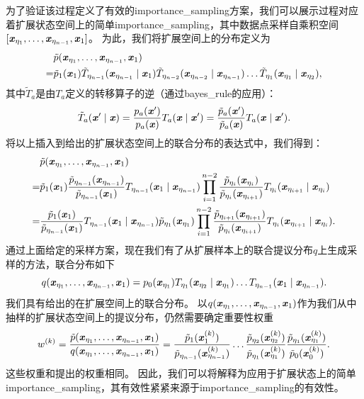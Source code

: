 为了验证该过程定义了有效的\gls{importance_sampling}方案，我们可以展示\citep{Neal-2001}过程对应着扩展状态空间上的简单\gls{importance_sampling}，其中数据点采样自乘积空间$[\Vx_{\eta_1},\dots,\Vx_{\eta_{n-1}},\Vx_1]$。
为此，我们将扩展空间上的分布定义为
\begin{align}
&\tilde{p} (\Vx_{\eta_1}, \dots, \Vx_{\eta_{n-1}}, \Vx_1) \\
= &\tilde{p}_1 (\Vx_1) \tilde{T}_{\eta_{n-1}} (\Vx_{\eta_{n-1}} \mid \Vx_1)
 	\tilde{T}_{\eta_{n-2}}  (\Vx_{\eta_{n-2}} \mid \Vx_{\eta_{n-1}}) \dots
 	\tilde{T}_{\eta_1} (\Vx_{\eta_1} \mid \Vx_{\eta_2}) \label{eq:18.55} ,
\end{align}
其中$\tilde{T}_a$是由$T_a$定义的转移算子的逆（通过\gls{bayes_rule}的应用）：
\begin{equation}
	\tilde{T}_a (\Vx' \mid \Vx) = \frac{p_a(\Vx')}{ p_a(\Vx) } T_a(\Vx \mid \Vx') = 
\frac{  \tilde{p}_a(\Vx')}{ \tilde{p}_a(\Vx) } T_a(\Vx \mid \Vx') .
\end{equation}
将以上插入到给出的扩展状态空间上的联合分布的表达式中，我们得到：
\begin{align}
	&\tilde{p} (\Vx_{\eta_1}, \dots, \Vx_{\eta_{n-1}}, \Vx_1) \\
	= &\tilde{p}_1 (\Vx_1) \frac{ \tilde{p}_{\eta_{n-1}} (\Vx_{\eta_{n-1}})  }{ \tilde{p}_{\eta_{n-1}}(\Vx_1)} T_{\eta_{n-1}} (\Vx_1 \mid \Vx_{\eta_{n-1}})
\prod_{i=1}^{n-2} \frac{ \tilde{p}_{\eta_i}(\Vx_{\eta_i}) }{ \tilde{p}_{\eta_i}(\Vx_{\eta_{i+1}})} T_{\eta_i} (\Vx_{\eta_{i+1}} \mid \Vx_{\eta_i}) \\
	= &\frac{ \tilde{p}_1(\Vx_1) }{ \tilde{p}_{\eta_{n-1}}(\Vx_1) } T_{\eta_{n-1}} (\Vx_1 \mid \Vx_{\eta_{n-1}})
\tilde{p}_{\eta_1} (\Vx_{\eta_1}) \prod_{i=1}^{n-2} \frac{ \tilde{p}_{\eta_{i+1}}(\Vx_{\eta_{i+1}}) }{ \tilde{p}_{\eta_i}(\Vx_{\eta_{i+1}}) } T_{\eta_i} (\Vx_{\eta_{i+1}} \mid \Vx_{\eta_i}) . \label{eq:18.59}
\end{align}
通过上面给定的采样方案，现在我们有了从扩展样本上的联合提议分布$q$上生成采样的方法，联合分布如下
\begin{equation}
	q(\Vx_{\eta_1}, \dots, \Vx_{\eta_{n-1}}, \Vx_1)  = p_0(\Vx_{\eta_1}) T_{\eta_1}( \Vx_{\eta_2} \mid \Vx_{\eta_1} ) \dots T_{\eta_{n-1}} (\Vx_1 \mid \Vx_{\eta_{n-1}}) .
\end{equation}
我们具有给出的在扩展空间上的联合分布。
以$q(\Vx_{\eta_1}, \dots, \Vx_{\eta_{n-1}}, \Vx_1)$作为我们从中抽样的扩展状态空间上的提议分布，仍然需要确定重要性权重
\begin{equation}
	w^{(k)} = \frac{ \tilde{p}(\Vx_{\eta_1}, \dots, \Vx_{\eta_{n-1}}, \Vx_1) }{ q( \Vx_{\eta_1}, \dots, \Vx_{\eta_{n-1}}, \Vx_1 ) } =
\frac{ \tilde{p}_1(\Vx_1^{(k)}) }{ \tilde{p}_{\eta_{n-1}}(\Vx_{\eta_{n-1}}^{(k)}) } \dots
\frac{ \tilde{p}_{\eta_{2}}(\Vx_{\eta_{2}}^{(k)}) }{ \tilde{p}_{\eta_1}(\Vx_{\eta_{1}}^{(k)}) } 
\frac{ \tilde{p}_{\eta_{1}}(\Vx_{\eta_{1}}^{(k)}) }{ \tilde{p}_{0}(\Vx_{0}^{(k)}) } .
\end{equation}
这些权重和提出的权重相同。
因此，我们可以将解释为应用于扩展状态上的简单\gls{importance_sampling}，其有效性紧紧来源于\gls{importance_sampling}的有效性。

